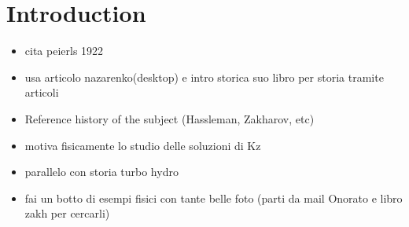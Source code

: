 

\newpage
\vphantom{}
\section*{Introduction}
\begin{itemize}
    \item cita peierls 1922
    \item usa articolo nazarenko(desktop) e intro storica suo libro per storia tramite articoli
    \item Reference history of the subject (Hassleman, Zakharov, etc)
    \item motiva fisicamente lo studio delle soluzioni di Kz
    \item parallelo con storia turbo hydro
    \item fai un botto di esempi fisici con tante belle foto (parti da mail Onorato e libro zakh per cercarli)
\end{itemize}



